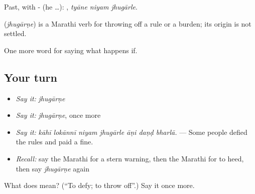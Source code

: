 Past, with - (he …):   , \emph{tyāne niyam jhugārle}.

\begin{cousinweb}
\textbf{} (\emph{jhugārṇe}) is a Marathi verb for throwing off a rule or a burden; its origin is not settled.
\end{cousinweb}

\begin{grammarlens}[title={What you've built}]
One more word for saying what happens if.
\end{grammarlens}

\subsection*{Your turn}
\begin{itemize}
\raggedright
  \item \emph{Say it:} \emph{jhugārṇe}
  \item \emph{Say it:} \emph{jhugārṇe}, once more
  \item \emph{Say it:} \emph{kāhī lokānnī niyam jhugārle āṇi daṇḍ bharlā.} — Some people defied the rules and paid a fine.
  \item \emph{Recall:} say the Marathi for a stern warning, then the Marathi for to heed, then say \emph{jhugārṇe} again
\end{itemize}

\begin{tcolorbox}[breakable,colback=teal!4,colframe=teal!35!black,title={Before you move on}]
What does  mean? (\textquotedblleft{}To defy; to throw off\textquotedblright{}.) Say it once more.
\end{tcolorbox}
